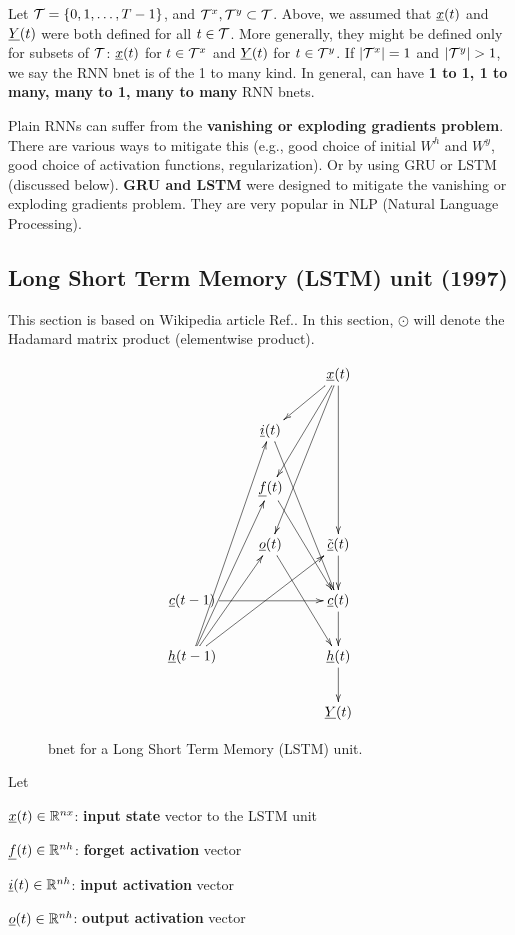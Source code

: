 Let ${\cal T}=\{0,1, \dots , T-1\}$,
and
${\cal T}^x, {\cal T}^y\subset {\cal T}$.
Above, 
we assumed that 
${\underline{x}}(t)$ and ${\underline{Y}}(t)$
were both defined 
for all $t\in {\cal T}$.
More generally, they 
might be defined only
for subsets of ${\cal T}$:
${\underline{x}}(t)$ for $t\in {\cal T}^x$
and 
${\underline{Y}}(t)$ for $t\in {\cal T}^y$.
If $|{\cal T}^x|=1$ and
$|\calt^y|>1$, 
we say the RNN bnet is of
the 1 to many kind.
In general, can have 
{\bf 1 to 1, 1 to many, many to 1, 
many to many} RNN bnets.

Plain RNNs can suffer 
from the
{\bf vanishing or exploding
 gradients problem}.
There are various ways to
mitigate this (e.g., good choice of initial
$W^h$ and $W^y$, 
good choice of activation 
functions, regularization).
Or by using GRU or LSTM (discussed below).
 {\bf GRU and LSTM}
were designed to mitigate the
vanishing or exploding gradients problem.
They are very popular in NLP (Natural
Language Processing).



\newpage

\subsection{Long  
Short Term Memory (LSTM) unit (1997)}

This section
is based on Wikipedia article 
Ref.\cite{lstm}. In this section,
$\odot$
will denote the Hadamard matrix product
(elementwise product).

\begin{figure}[h!]
\centering
$$\xymatrix{
&&\rvx(t)\ar[ddd]\ar[dl]\ar[ldd]\ar[lddd]
\\
&\rvi(t)\ar[rddd]
&\\
&\rvf(t)\ar[rdd]&\\
&\rvo(t)\ar[ddr]
&\tilde{\rvc}(t)\ar[d]
\\
\rvc(t-1)\ar[rr]
&&\rvc(t)\ar[d]
\\
\rvh(t-1)\ar[ruuuu]\ar[ruuu]\ar[ruu]\ar[rruu]
&&\rvh(t)\ar[d]\\
&&\rvY(t)
}$$
\caption{
bnet for a Long Short Term Memory
 (LSTM) unit.}
\label{fig-rnn-lstm}
\end{figure}

Let

${\underline{x}}(t)\in { \mathbb{R}}^{nx}$:
{\bf input state} vector to the LSTM unit

${\underline{f}}(t)\in { \mathbb{R}}^{nh}$:
{\bf forget activation} vector

${\underline{i}}(t)\in { \mathbb{R}}^{nh}$:
{\bf input activation} vector

${\underline{o}}(t)\in { \mathbb{R}}^{nh}$:
{\bf output activation} vector

